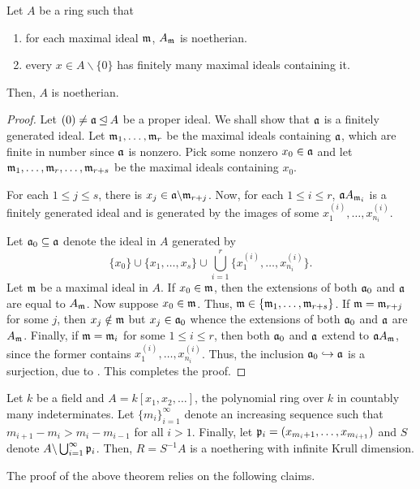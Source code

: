 \begin{lemma}
    Let $A$ be a ring such that 
    \begin{enumerate}[label=(\alph*)]
        \item for each maximal ideal $\mathfrak m$, $A_\mathfrak m$ is noetherian. 
        \item every $x\in A\backslash\{0\}$ has finitely many maximal ideals containing it.
    \end{enumerate}
    Then, $A$ is noetherian.
\end{lemma}
\begin{proof}
    Let $(0)\ne \mathfrak a\unlhd A$ be a proper ideal. We shall show that $\mathfrak a$ is a finitely generated ideal. Let $\mathfrak m_1,\dots,\mathfrak m_r$ be the maximal ideals containing $\mathfrak a$, which are finite in number since $\mathfrak a$ is nonzero. Pick some nonzero $x_0\in\mathfrak a$ and let $\mathfrak m_1,\dots,\mathfrak m_r,\dots,\mathfrak m_{r + s}$ be the maximal ideals containing $x_0$. 

    For each $1\le j\le s$, there is $x_j\in\mathfrak a\backslash\mathfrak m_{r + j}$. Now, for each $1\le i\le r$, $\mathfrak a A_{\mathfrak m_i}$ is a finitely generated ideal and is generated by the images of some $x^{(i)}_1,\dots,x^{(i)}_{n_i}$. 

    Let $\mathfrak a_0\subseteq\mathfrak a$ denote the ideal in $A$ generated by 
    \begin{equation*}
        \{x_0\}\cup\{x_1,\dots,x_s\}\cup\bigcup_{i = 1}^r \{x^{(i)}_1,\dots,x^{(i)}_{n_i}\}.
    \end{equation*}
    Let $\mathfrak m$ be a maximal ideal in $A$. If $x_0\in\mathfrak m$, then the extensions of both $\mathfrak a_0$ and $\mathfrak a$ are equal to $A_\mathfrak m$. Now suppose $x_0\in\mathfrak m$. Thus, $\mathfrak m\in\{\mathfrak m_1,\dots,\mathfrak m_{r + s}\}$. If $\mathfrak m = \mathfrak m_{r + j}$ for some $j$, then $x_j\notin\mathfrak m$ but $x_j\in\mathfrak a_0$ whence the extensions of both $\mathfrak a_0$ and $\mathfrak a$ are $A_\mathfrak m$. Finally, if $\mathfrak m = \mathfrak m_i$ for some $1\le i\le r$, then both $\mathfrak a_0$ and $\mathfrak a$ extend to $\mathfrak a A_{\mathfrak m}$, since the former contains $x^{(i)}_1,\dots,x^{(i)}_{n_i}$. Thus, the inclusion $\mathfrak a_0\hookrightarrow\mathfrak a$ is a surjection, due to . This completes the proof.
\end{proof}

\begin{theorem}
    Let $k$ be a field and $A = k[x_1,x_2,\dots]$, the polynomial ring over $k$ in countably many indeterminates. Let $\{m_i\}_{i = 1}^\infty$ denote an increasing sequence such that $m_{i + 1} - m_i > m_i - m_{i - 1}$ for all $i > 1$. Finally, let $\mathfrak p_i = (x_{m_i + 1},\dots,x_{m_{i + 1}})$ and $S$ denote $A\backslash\bigcup_{i = 1}^\infty\mathfrak p_i$. Then, $R = S^{-1}A$ is a noethering with infinite Krull dimension.
\end{theorem}
The proof of the above theorem relies on the following claims. 

